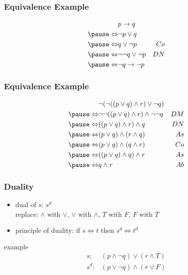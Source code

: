 \documentclass[dvipsnames]{beamer}
\begin{document}
\begin{frame}
  \frametitle{Equivalence Example}

  \begin{eqnarray*}
                    & p \rightarrow q           &   \\
    \pause
    \Leftrightarrow & \neg p \vee q             &   \\
    \pause
    \Leftrightarrow & q \vee \neg p             & Co\\
    \pause
    \Leftrightarrow & \neg \neg q \vee \neg p   & DN\\
    \pause
    \Leftrightarrow & \neg q \rightarrow \neg p &
  \end{eqnarray*}
\end{frame}

\begin{frame}
  \frametitle{Equivalence Example}

  \begin{eqnarray*}
                    & \neg (\neg ((p \vee q) \wedge r) \vee \neg q)      &   \\
    \pause
    \Leftrightarrow & \neg \neg ((p \vee q) \wedge r) \wedge \neg \neg q & DM\\
    \pause
    \Leftrightarrow & ((p \vee q) \wedge r) \wedge q                     & DN\\
    \pause
    \Leftrightarrow & (p \vee q) \wedge (r \wedge q)                     & As\\
    \pause
    \Leftrightarrow & (p \vee q) \wedge (q \wedge r)                     & Co\\
    \pause
    \Leftrightarrow & ((p \vee q) \wedge q) \wedge r                     & As\\
    \pause
    \Leftrightarrow & q \wedge r                                         & Ab
  \end{eqnarray*}
\end{frame}

\begin{frame}
  \frametitle{Duality}

  \begin{itemize}
    \item \alert{dual} of $s$: $s^d$\\
      replace: $\wedge$ with $\vee$, $\vee$ with $\wedge$, $T$ with $F$, $F$ with $T$

    \pause
    \medskip
    \item \alert{principle of duality}:
      if $s \Leftrightarrow t$ then $s^d \Leftrightarrow t^d$
  \end{itemize}

  \pause
  \begin{exampleblock}{example}
    \begin{eqnarray*}
      s:   & (p \wedge \neg q) \vee (r \wedge T)\\
      s^d: & (p \vee \neg q) \wedge (r \vee F)
    \end{eqnarray*}
  \end{exampleblock}
\end{frame}
\end{document}
